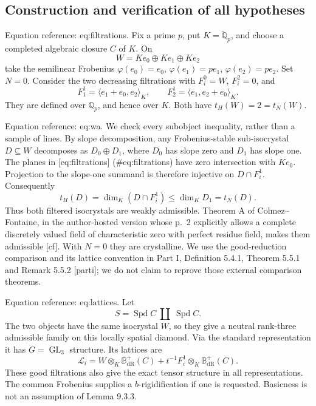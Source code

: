 \documentclass[10pt]{article}
\begin{document}
\subsection*{Construction and verification of all hypotheses}
Equation reference: eq:filtrations. Fix a prime \(p\), put \(K=\breve{\mathbb Q}_p\), and choose a completed algebraic closure \(C\) of \(K\). On \[W=K e_0\oplus K e_1\oplus K e_2\] take the semilinear Frobenius \(\varphi(e_0)=e_0\), \(\varphi(e_1)=p e_1\), \(\varphi(e_2)=p e_2\). Set \(N=0\). Consider the two decreasing filtrations with \(F_i^0=W\), \(F_i^2=0\), and \[
 F_1^1=\langle e_1+e_0,e_2\rangle_K,\qquad
 F_2^1=\langle e_1,e_2+e_0\rangle_K .\] They are defined over \(\mathbb Q_p\), and hence over \(K\). Both have \(t_H(W)=2=t_N(W)\).\par
Equation reference: eq:wa. We check every subobject inequality, rather than a sample of lines. By slope decomposition, any Frobenius-stable sub-isocrystal \(D\subseteq W\) decomposes as \(D_0\oplus D_1\), where \(D_0\) has slope zero and \(D_1\) has slope one. The planes in [eq:filtrations] (\#eq:filtrations) have zero intersection with \(K e_0\). Projection to the slope-one summand is therefore injective on \(D\cap F_i^1\). Consequently \[
 t_H(D)=\dim_K(D\cap F_i^1)
       \leq \dim_K D_1=t_N(D).\] Thus both filtered isocrystals are weakly admissible. Theorem A of Colmez–Fontaine, in the author-hosted version whose p. 2 explicitly allows a complete discretely valued field of characteristic zero with perfect residue field, makes them admissible [cf]. With \(N=0\) they are crystalline. We use the good-reduction comparison and its lattice convention in Part I, Definition 5.4.1, Theorem 5.5.1 and Remark 5.5.2 [parti]; we do not claim to reprove those external comparison theorems.\par
Equation reference: eq:lattices. Let \[S=\operatorname{Spd}C\ \coprod\ \operatorname{Spd}C .\] The two objects have the same isocrystal \(W\), so they give a neutral rank-three admissible family on this locally spatial diamond. Via the standard representation it has \(G=\operatorname{GL}_3\) structure. Its lattices are \[
 \mathcal L_i=W\otimes_K\mathbb B_{\mathrm{dR}}^+(C)
       +t^{-1}F_i^1\otimes_K\mathbb B_{\mathrm{dR}}^+(C).\] These good filtrations also give the exact tensor structure in all representations. The common Frobenius supplies a \(b\)-rigidification if one is requested. Basicness is not an assumption of Lemma 9.3.3.\par
\end{document}
